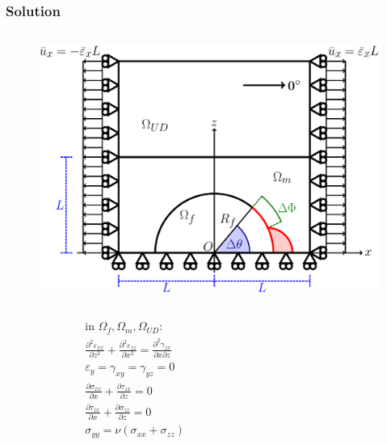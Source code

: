 \documentclass[first,firstsupp,lastsupp,last,hyperref,table]{ETHclass}
\begin{document}
\begin{frame}
\frametitle{\vspace{0.4cm}\small Solution}
\vspace{-1.1cm}
\centering
\begin{columns}
\begin{column}{0.6\textwidth}
\begin{figure}
\includegraphics[width=0.825\columnwidth]{RUC.pdf}
\end{figure}
\vspace{-1cm}
\begin{columns}
\begin{column}{0.3\columnwidth}
\tiny
\begin{equation*}
\begin{aligned}
&\text{in }\Omega_{f}, \Omega_{m}, \Omega_{UD}:\\
&\frac{\partial^{2}\varepsilon_{xx}}{\partial z^{2}}+\frac{\partial^{2}\varepsilon_{zz}}{\partial x^{2}}=\frac{\partial^{2}\gamma_{zx}}{\partial x\partial z}\\
&\varepsilon_{y}=\gamma_{xy}=\gamma_{yz}=0\\
&\frac{\partial\sigma_{xx}}{\partial x}+\frac{\partial\tau_{zx}}{\partial z} = 0\\
&\frac{\partial\tau_{zx}}{\partial x}+\frac{\partial\sigma_{zz}}{\partial z} = 0\\
&\sigma_{yy}=\nu\left(\sigma_{xx}+\sigma_{zz}\right)\\
\end{aligned}
\end{equation*}
\end{column}
\begin{column}{0.675\columnwidth}
\tiny
\begin{equation*}
\begin{aligned}

\end{aligned}
\end{equation*}
\end{column}
\end{columns}
\end{column}
\end{columns}
\end{frame}
\end{document}

